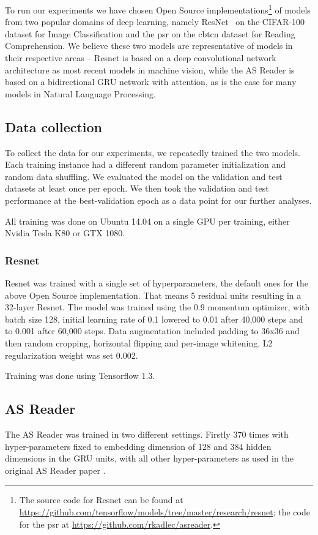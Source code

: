 \documentclass{article}
\newcommand{\asr}{\gls{psr}\xspace}
\newcommand{\cbtcn}{\gls{cbtcn}\xspace}
\begin{document}
\begin{appendices}
To run our experiments we have chosen Open Source implementations\footnote{The source code for Resnet can be found at \url{https://github.com/tensorflow/models/tree/master/research/resnet}; the code for the \asr at \url{https://github.com/rkadlec/asreader}.} of models from two popular domains of deep learning, namely ResNet~\citep{he2016deep} on the CIFAR-100 dataset \citep{krizhevsky2009learning} for Image Classification and the \asr \citep{Kadlec2016} on the \cbtcn dataset \citep{hill2015goldilocks} for Reading Comprehension. We believe these two models are representative of models in their respective areas -- Resnet is based on a deep convolutional network architecture as most recent models in machine vision, while the AS Reader is based on a bidirectional GRU network with attention, as is the case for many models in Natural Language Processing. 


\subsection{Data collection}
To collect the data for our experiments, we repeatedly trained the two models. Each training instance had a different random parameter initialization and random data shuffling. We evaluated the model on the validation and test datasets at least once per epoch. We then took the validation and test performance at the best-validation epoch as a data point for our further analyses.

All training was done on Ubuntu 14.04 on a single GPU per training, either Nvidia Tesla K80 or GTX 1080.

\subsubsection{Resnet}
Resnet was trained with a single set of hyperparameters, the default ones for the above Open Source implementation. That means 5 residual units resulting in a 32-layer Resnet. The model was trained using the 0.9 momentum optimizer, with batch size 128, initial learning rate of 0.1 lowered to 0.01 after 40,000 steps and to 0.001 after 60,000 steps. Data augmentation included padding to 36x36 and then random cropping, horizontal flipping and per-image whitening. L2 regularization weight was set 0.002. 

Training was done using Tensorflow 1.3.

\subsection{AS Reader}
The AS Reader was trained in two different settings. Firstly 370 times with hyper-parameters fixed to embedding dimension of 128 and 384 hidden dimensions in the GRU units, with all other hyper-parameters as used in the original AS Reader paper \citep{Kadlec2016}.


\end{appendices}
\end{document}
